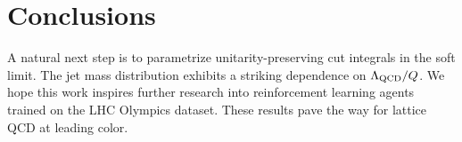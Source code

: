 \section{Conclusions}\label{sec:conclusions}

A natural next step is to parametrize unitarity-preserving cut integrals
in the soft limit. The jet mass distribution exhibits a striking
dependence on $\Lambda_{\rm QCD}/Q$. We hope this work inspires further
research into reinforcement learning agents trained on the LHC Olympics
dataset. These results pave the way for lattice QCD at leading color.

